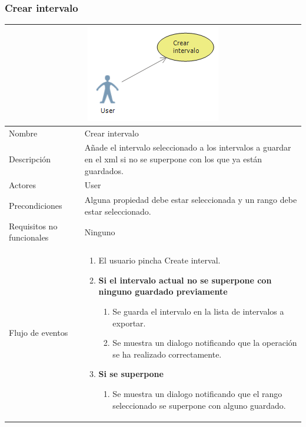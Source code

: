 \subsubsection{Crear intervalo}
\begin{table}[H]
	\begin{center}
		\begin{tabular}{|l*{1}{p{10cm}}|}
			
			\multicolumn{2}{c}{\includegraphics[width=0.4\linewidth]{./Figures/CrearIntervalo.png}} \\
			\hline
		    Nombre                     & Crear intervalo \\
		    Descripci\'on              & A\~nade el intervalo seleccionado
		    							 a los intervalos a guardar en el xml si
		    							 no se superpone con los que ya est\'an guardados.\\ 
		    Actores                    & User  \\
		    Precondiciones             & Alguna propiedad debe estar seleccionada
		    							 y un rango debe estar seleccionado.  \\
		    Requisitos no funcionales  & Ninguno  \\
		    Flujo de eventos           & \begin{enumerate}
		    								\item El usuario pincha Create interval.
		    								\item \textbf{Si el intervalo actual
		    								no se superpone con ninguno
		    								guardado previamente}
		    								\begin{enumerate}
		    									\item Se guarda el intervalo en la lista
		    									de intervalos a exportar.
		    									\item Se muestra un dialogo notificando que
		    									la operaci\'on se ha realizado correctamente.
		    								\end{enumerate}
		    								\item \textbf{Si se superpone}
		    								\begin{enumerate}
			    								\item Se muestra un dialogo notificando que
		    									el rango seleccionado se superpone con alguno
		    									guardado.
		    								\end{enumerate}
		    								

\end{enumerate}
\end{tabular}
\end{center}
\end{table}
